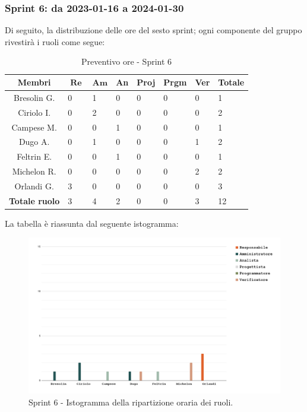 \documentclass[10pt, a4paper]{article}
\begin{document}
\subsubsection{Sprint 6: da 2023-01-16 a 2024-01-30}
Di seguito, la distribuzione delle ore del sesto sprint; ogni componente del gruppo rivestirà i ruoli come segue:
\begin{table}[H]
\begin{tabularx}{\textwidth}{c|X|X|X|X|X|X|X}
        \textbf{Membri} & $\operatorname{\textbf{Re}}$ & $\mathrm{\textbf{Am}}$ & \textbf{An} & \textbf{Proj} & \textbf{Prgm} & \textbf{Ver} & \textbf{Totale} \\
        \hline Bresolin G. & 0 & \cellcolor{primarycolor}1 & 0 & 0 & 0 & 0 & 1 \\
        \hline Ciriolo I.  & 0 & \cellcolor{primarycolor}2 & 0 & 0 & 0 & 0 & 2 \\
        \hline Campese M.  & 0 & 0 & \cellcolor{primarycolor}1 & 0 & 0 & 0 & 1 \\
        \hline Dugo A.     & 0 & \cellcolor{primarycolor}1 & 0 & 0 & 0 & 1 & 2 \\
        \hline Feltrin E.  & 0 & 0 & \cellcolor{primarycolor}1 & 0 & 0 & 0 & 1 \\
        \hline Michelon R. & 0 & 0 & 0 & 0 & 0 & \cellcolor{primarycolor}2 & 2 \\
        \hline Orlandi G.  & \cellcolor{primarycolor}3 & 0 & 0 & 0 & 0 & 0 & 3 \\
        \hline
        \textbf{Totale ruolo} & 3 & 4 & 2 & 0 & 0 & 3 & 12
    \end{tabularx}
    \caption{Preventivo ore - Sprint 6}
    \end{table}

La tabella è riassunta dal seguente istogramma:
 \begin{figure}[H]
        \centering        
        \includegraphics[width=15.5cm]{istogrammi/istogramma_6_periodo.png}
        \caption{Sprint 6 - Istogramma della ripartizione oraria dei ruoli. }
    \end{figure}
\end{document}
